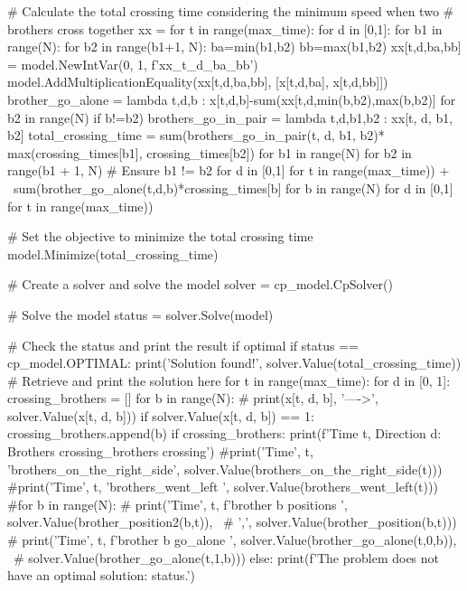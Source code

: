 \begin{python}
  # Calculate the total crossing time considering the minimum speed when two
  # brothers cross together
  xx = {}
  for t in range(max_time):
    for d in [0,1]:
      for b1 in range(N):
        for b2 in range(b1+1, N):
          ba=min(b1,b2)
          bb=max(b1,b2)
          xx[t,d,ba,bb] = model.NewIntVar(0, 1, f'xx_{t}_{d}_{ba}_{bb}')
          model.AddMultiplicationEquality(xx[t,d,ba,bb], [x[t,d,ba], x[t,d,bb]])
  brother_go_alone = lambda t,d,b : x[t,d,b]-sum(xx[t,d,min(b,b2),max(b,b2)] for b2 in range(N) if b!=b2)
  brothers_go_in_pair = lambda t,d,b1,b2 : xx[t, d, b1, b2]
  total_crossing_time = sum(brothers_go_in_pair(t, d, b1, b2)*
                            max(crossing_times[b1], crossing_times[b2])
                            for b1 in range(N)
                            for b2 in range(b1 + 1, N)  # Ensure b1 != b2
                            for d in [0,1]
                            for t in range(max_time)) + \
                        sum(brother_go_alone(t,d,b)*crossing_times[b]
                            for b in range(N)
                            for d in [0,1]
                            for t in range(max_time))


  # Set the objective to minimize the total crossing time
  model.Minimize(total_crossing_time)

  # Create a solver and solve the model
  solver = cp_model.CpSolver()

  # Solve the model
  status = solver.Solve(model)

  # Check the status and print the result if optimal
  if status == cp_model.OPTIMAL:
    print('Solution found!', solver.Value(total_crossing_time))
    # Retrieve and print the solution here
    for t in range(max_time):
      for d in [0, 1]:
        crossing_brothers = []
        for b in range(N):
          # print(x[t, d, b], '---->', solver.Value(x[t, d, b]))
          if solver.Value(x[t, d, b]) == 1:
            crossing_brothers.append(b)
        if crossing_brothers:
          print(f'Time {t}, Direction {d}: Brothers {crossing_brothers} crossing')
      #print('Time', t, 'brothers_on_the_right_side', solver.Value(brothers_on_the_right_side(t)))
      #print('Time', t, 'brothers_went_left        ', solver.Value(brothers_went_left(t)))
      #for b in range(N):
      #  print('Time', t, f'brother {b} positions       ', solver.Value(brother_position2(b,t)), \
      #        ',', solver.Value(brother_position(b,t)))
      #  print('Time', t, f'brother {b} go_alone        ', solver.Value(brother_go_alone(t,0,b)), \
      #                                                 solver.Value(brother_go_alone(t,1,b)))
  else:
    print(f'The problem does not have an optimal solution: {status}.')

\end{python}

